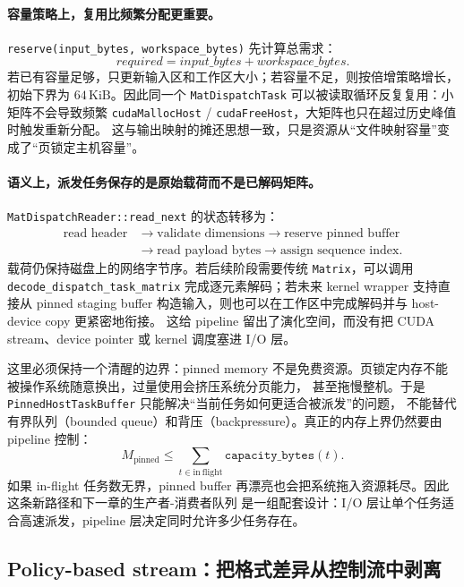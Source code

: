 \paragraph{容量策略上，复用比频繁分配更重要。}
\texttt{reserve(input\_bytes, workspace\_bytes)} 先计算总需求：
\[
    required = input\_bytes + workspace\_bytes.
\]
若已有容量足够，只更新输入区和工作区大小；若容量不足，则按倍增策略增长，初始下界为
$64\,\mathrm{KiB}$。因此同一个 \texttt{MatDispatchTask} 可以被读取循环反复复用：小矩阵不会导致频繁
\texttt{cudaMallocHost} / \texttt{cudaFreeHost}，大矩阵也只在超过历史峰值时触发重新分配。
这与输出映射的摊还思想一致，只是资源从“文件映射容量”变成了“页锁定主机容量”。

\paragraph{语义上，派发任务保存的是原始载荷而不是已解码矩阵。}
\texttt{MatDispatchReader::read\_next} 的状态转移为：
\[
    \begin{aligned}
        \text{read header}
         & \longrightarrow
        \text{validate dimensions}
        \longrightarrow
        \text{reserve pinned buffer} \\
         & \longrightarrow
        \text{read payload bytes}
        \longrightarrow
        \text{assign sequence index}.
    \end{aligned}
\]
载荷仍保持磁盘上的网络字节序。若后续阶段需要传统 \texttt{Matrix}，可以调用
\texttt{decode\_dispatch\_task\_matrix} 完成逐元素解码；若未来 kernel wrapper 支持直接从 pinned staging buffer
构造输入，则也可以在工作区中完成解码并与 host-device copy 更紧密地衔接。
这给 pipeline 留出了演化空间，而没有把 CUDA stream、device pointer 或 kernel 调度塞进 I/O 层。

这里必须保持一个清醒的边界：pinned memory 不是免费资源。页锁定内存不能被操作系统随意换出，过量使用会挤压系统分页能力，
甚至拖慢整机。于是 \texttt{PinnedHostTaskBuffer} 只能解决“当前任务如何更适合被派发”的问题，
不能替代有界队列（bounded queue）和背压（backpressure）。真正的内存上界仍然要由 pipeline 控制：
\[
    M_{\mathrm{pinned}}
    \le
    \sum_{t\in\mathrm{in\ flight}}
    \texttt{capacity\_bytes}(t).
\]
如果 in-flight 任务数无界，pinned buffer 再漂亮也会把系统拖入资源耗尽。因此这条新路径和下一章的生产者-消费者队列
是一组配套设计：I/O 层让单个任务适合高速派发，pipeline 层决定同时允许多少任务存在。

\subsection{Policy-based stream：把格式差异从控制流中剥离}

